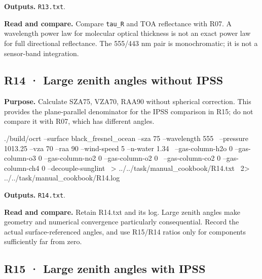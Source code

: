 \textbf{Outputs. }\texttt{R13.txt}.

\textbf{Read and compare. }Compare \texttt{tau\_\allowbreak{}R} and TOA reflectance with R07. A wavelength power law for molecular optical thickness is not an exact power law for full directional reflectance. The 555/443 nm pair is monochromatic; it is not a sensor-band integration.


\subsection{R14 · Large zenith angles without IPSS}
\label{sec:auto:09_cookbook:3.8}

\label{recipe:R14}

\textbf{Purpose. }Calculate SZA75\textdegree{}, VZA70\textdegree{}, RAA90\textdegree{} without spherical correction. This provides the plane-parallel denominator for the IPSS comparison in R15; do not compare it with R07, which has different angles.

\noindent\begin{minipage}{\linewidth}
\begin{ManualCode}

./build/ocrt --surface black_fresnel_ocean --sza 75 --wavelength 555 \
  --pressure 1013.25 --vza 70 --raa 90 --wind-speed 5 --n-water 1.34 \
  --gas-column-h2o 0 --gas-column-o3 0 --gas-column-no2 0 --gas-column-o2 0 \
  --gas-column-co2 0 --gas-column-ch4 0 --decouple-sunglint \
  > ../../task/manual_cookbook/R14.txt \
  2> ../../task/manual_cookbook/R14.log

\end{ManualCode}
\end{minipage}\par

\textbf{Outputs. }\texttt{R14.txt}.

\textbf{Read and compare. }Retain R14.txt and its log. Large zenith angles make geometry and numerical convergence particularly consequential. Record the actual surface-referenced angles, and use R15/R14 ratios only for components sufficiently far from zero.


\subsection{R15 · Large zenith angles with IPSS}
\label{sec:auto:09_cookbook:3.9}

